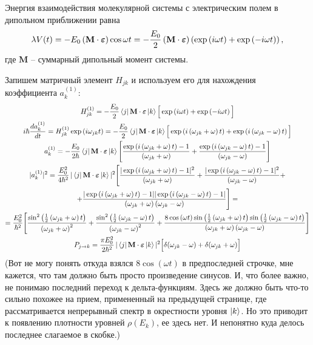 \documentclass[12pt]{article}
\newcommand{\lb}{\left(}
\newcommand{\rb}{\right)}
\newcommand{\mf}{\mathbf}
\newcommand{\vverh}{\vspace*{-0.15cm}}
\begin{document}
Энергия взаимодействия молекулярной системы с электрическим полем в дипольном приближении равна
\vverh
\begin{gather}
	\lambda V(t) = - E_0 \lb \mf{M} \cdot \boldsymbol{\varepsilon} \rb \cos \omega t = - \frac{E_0}{2} \lb \mf{M} \cdot \boldsymbol{\varepsilon} \rb \lb \exp \lb i \omega t \rb + \exp \lb - i \omega t \rb \rb ,\notag
\end{gather}
где $\mf{M}$ -- суммарный дипольный момент системы.

Запишем матричный элемент $H_{jk}$  и используем его для нахождения коэффициента $a_k^{(1)}$:
\vverh
\begin{gather}
	H_{jk}^{(1)} = -\frac{E_0}{2} \bra{j} \mf{M} \cdot \boldsymbol{\varepsilon} \ket{k} \Big[ \exp \lb i \omega t \rb + \exp \lb - i \omega t \rb \Big] \notag \\
	i \hbar \frac{d a_k^{(1)}}{dt} = H_{jk}^{(1)} \exp \lb i \omega_{jk} t \rb = -\frac{E_0}{2} \bra{j} \mf{M} \cdot \boldsymbol{\varepsilon} \ket{k} \Big[ \exp \lb i \lb \omega_{jk} + \omega \rb t \rb + \exp \lb i \lb \omega_{jk} - \omega \rb t \rb \Big] \notag \\
	a_k^{(1)} = - \frac{E_0}{2 \hbar} \bra{j} \mf{M} \cdot \boldsymbol{\varepsilon} \ket{k} \Bigg[ \frac{ \exp \lb i \lb \omega_{jk} + \omega \rb t \rb - 1}{\lb \omega_{jk} + \omega \rb} + \frac{\exp \lb i \lb \omega_{jk} - \omega \rb t \rb - 1}{\lb \omega_{jk} - \omega \rb} \Bigg] \notag \\
	| a_k^{(1)} |^2 = \frac{E_0^2}{4 \hbar^2} \, | \bra{j} \mf{M} \cdot \boldsymbol{\varepsilon} \ket{k} |^2 \Bigg[ \frac{ | \exp \lb i \lb \omega_{jk} + \omega \rb t \rb - 1 |^2 }{\lb \omega_{jk} + \omega \rb } + \frac{| \exp \lb i \lb \omega_{jk} - \omega \rb t \rb  - 1|^2 }{ \lb \omega_{jk} - \omega \rb}+ \notag \\ 
	+ \frac{|\exp \lb i \lb \omega_{jk} + \omega \rb t \rb - 1 | | \exp \lb i \lb \omega_{jk} - \omega \rb t \rb - 1|}{\lb \omega_{jk} + \omega \rb \lb \omega_{jk} - \omega \rb} \Bigg] = \notag \\
	= \frac{E_0^2}{\hbar^2} \Bigg[ \frac{\sin^2 \lb \frac{1}{2} \lb \omega_{jk} + \omega \rb t \rb}{\lb \omega_{jk} + \omega \rb^2} + \frac{ \sin^2 \lb \frac{1}{2} \lb \omega_{jk} - \omega \rb t \rb}{ \lb \omega_{jk} - \omega \rb^2 } + \frac{8 \cos \lb \omega t \rb \sin \lb \frac{1}{2} \lb \omega_{jk} + \omega \rb t \rb \sin \lb \frac{1}{2} \lb \omega_{jk} - \omega \rb t \rb }{ \lb \omega_{jk} + \omega \rb \lb \omega_{jk} - \omega \rb} \Bigg] \notag \\
	P_{j \rightarrow k} = \frac{\pi E_0^2}{2 \hbar^2} \, | \bra{j} \mf{M} \cdot \boldsymbol{\varepsilon} \ket{k} |^2  \Big[ \delta(\omega_{jk} - \omega) + \delta( \omega_{jk} + \omega) \Big] \label{eq:prob}
\end{gather}
(Вот не могу понять откуда взялся $8 \cos \lb \omega t \rb$ в предпоследней строчке, мне кажется, что там должно быть просто произведение синусов. И, что более важно, не понимаю последний переход к дельта-функциям. Здесь же должно быть что-то сильно похожее на прием, примененный на предыдущей странице, где рассматривается непрерывный спектр в окрестности уровня $\ket{k}$. Но это приводит к появлению плотности уровней $\rho (E_k)$, ее здесь нет. И непонятно куда делось последнее слагаемое в скобке.) 
\end{document}
